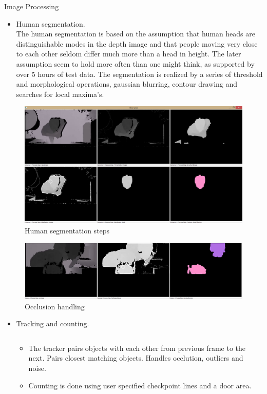 \documentclass[final,hyperref={pdfpagelabels=false}]{beamer}
\begin{document}
\begin{frame}[t]
\begin{columns}[t]
\begin{column}{.465\textwidth}
\begin{block}{Image Processing}
\begin{itemize}
\item Human segmentation.\\
The human segmentation is based on the assumption that human heads are distinguishable modes in the depth image and that people moving very close to each other seldom differ much more than a head in height. The later assumption seem to hold more often than one might think, as supported by over 5 hours of test data. The segmentation is realized by a series of threshold and morphological operations, gaussian blurring, contour drawing and searches for local maxima's.
\end{itemize}
\begin{figure}
\includegraphics[width=0.8\linewidth]{humanSegmentationSteps.png}
\caption{Human segmentation steps}
\end{figure}
\begin{figure}
\includegraphics[width=0.8\linewidth]{KinectSegmentationIllustration_occlusionHandling_horizontal.png}
\caption{Occlusion handling}
\end{figure}
\begin{itemize}
\item Tracking and counting.
\begin{columns}
\begin{column}{0.45\textwidth}
\begin{itemize}
\item{The tracker pairs objects with each other from previous frame to the next. Pairs closest matching objects. Handles occlution, outliers and noise.}
\item{Counting is done using user specified checkpoint lines and a door area.}

\end{itemize}
\end{column}
\end{columns}
\end{itemize}
\end{block}
\end{column}
\end{columns}
\end{frame}
\end{document}
